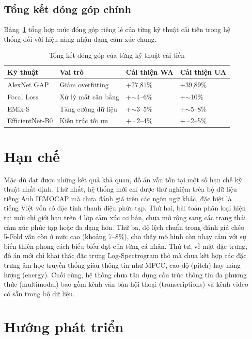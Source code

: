 \subsection{Tổng kết đóng góp chính}

Bảng~\ref{tab:contribution} tổng hợp mức đóng góp riêng lẻ của từng kỹ thuật cải tiến trong hệ thống đối với hiệu năng nhận dạng cảm xúc chung.

\begin{table}[H]
\centering
\caption{Tổng kết đóng góp của từng kỹ thuật cải tiến}
\label{tab:contribution}
\begin{tabular}{llll}
\toprule
\textbf{Kỹ thuật} & \textbf{Vai trò} & \textbf{Cải thiện WA} & \textbf{Cải thiện UA} \\
\midrule
AlexNet GAP & Giảm overfitting & +27,81\% & +39,89\% \\
Focal Loss & Xử lý mất cân bằng & +$\sim$4--6\% & +$\sim$10\% \\
EMix-S & Tăng cường dữ liệu & +$\sim$3--5\% & +$\sim$5--8\% \\
EfficientNet-B0 & Kiến trúc tối ưu & +$\sim$2--4\% & +$\sim$2--5\% \\
\bottomrule
\end{tabular}
\end{table}


\section{Hạn chế}
\label{sec:limitations}

Mặc dù đạt được những kết quả khả quan, đồ án vẫn tồn tại một số hạn chế kỹ thuật nhất định. Thứ nhất, hệ thống mới chỉ được thử nghiệm trên bộ dữ liệu tiếng Anh IEMOCAP mà chưa đánh giá trên các ngôn ngữ khác, đặc biệt là tiếng Việt vốn có đặc tính thanh điệu phức tạp. Thứ hai, bài toán phân loại hiện tại mới chỉ giới hạn trên 4 lớp cảm xúc cơ bản, chưa mở rộng sang các trạng thái cảm xúc phức tạp hoặc đa dạng hơn. Thứ ba, độ lệch chuẩn trong đánh giá chéo 5-Fold vẫn còn ở mức cao (khoảng 7--8$\%$), cho thấy mô hình còn nhạy cảm với sự biến thiên phong cách biểu biểu đạt của từng cá nhân. Thứ tư, về mặt đặc trưng, đồ án mới chỉ khai thác đặc trưng Log-Spectrogram thô mà chưa kết hợp các đặc trưng âm học truyền thống giàu thông tin như MFCC, cao độ (pitch) hay năng lượng (energy). Cuối cùng, hệ thống chưa tận dụng cấu trúc thông tin đa phương thức (multimodal) bao gồm kênh văn bản hội thoại (transcriptions) và kênh video có sẵn trong bộ dữ liệu.


\section{Hướng phát triển}
\label{sec:future_work}

